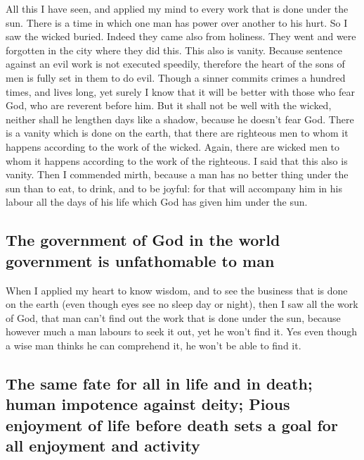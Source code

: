  All this I have seen, and applied my mind to every work
that is done under the sun. There is a time in which one man has power
over another to his hurt.  So I saw the wicked buried.
Indeed they came also from holiness. They went and were forgotten in the
city where they did this. This also is vanity.  Because
sentence against an evil work is not executed speedily, therefore the
heart of the sons of men is fully set in them to do evil.
 Though a sinner commits crimes a hundred times, and
lives long, yet surely I know that it will be better with those who fear
God, who are reverent before him.  But it shall not be
well with the wicked, neither shall he lengthen days like a shadow,
because he doesn't fear God.  There is a vanity which is
done on the earth, that there are righteous men to whom it happens
according to the work of the wicked. Again, there are wicked men to whom
it happens according to the work of the righteous. I said that this also
is vanity.  Then I commended mirth, because a man has no
better thing under the sun than to eat, to drink, and to be joyful: for
that will accompany him in his labour all the days of his life which God
has given him under the sun.

\hypertarget{the-government-of-god-in-the-world-government-is-unfathomable-to-man}{%
\subsection{The government of God in the world government is
unfathomable to
man}\label{the-government-of-god-in-the-world-government-is-unfathomable-to-man}}

 When I applied my heart to know wisdom, and to see the
business that is done on the earth (even though eyes see no sleep day or
night),  then I saw all the work of God, that man can't
find out the work that is done under the sun, because however much a man
labours to seek it out, yet he won't find it. Yes even though a wise man
thinks he can comprehend it, he won't be able to find it.

\hypertarget{the-same-fate-for-all-in-life-and-in-death-human-impotence-against-deity-pious-enjoyment-of-life-before-death-sets-a-goal-for-all-enjoyment-and-activity}{%
\subsection{The same fate for all in life and in death; human impotence
against deity; Pious enjoyment of life before death sets a goal for all
enjoyment and
activity}\label{the-same-fate-for-all-in-life-and-in-death-human-impotence-against-deity-pious-enjoyment-of-life-before-death-sets-a-goal-for-all-enjoyment-and-activity}}

